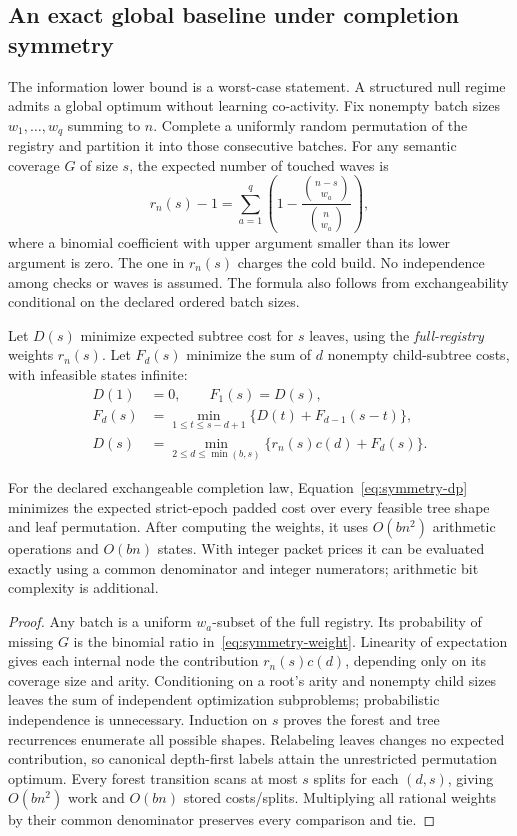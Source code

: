 \subsection{An exact global baseline under completion symmetry}\label{sec:symmetry}
The information lower bound is a worst-case statement. A structured null
regime admits a global optimum without learning co-activity. Fix nonempty
batch sizes $w_1,\ldots,w_q$ summing to $n$. Complete a uniformly random
permutation of the registry and partition it into those consecutive batches.
For any semantic coverage $G$ of size $s$, the expected number of touched
waves is
\begin{equation}\label{eq:symmetry-weight}
 r_n(s)-1=\sum_{a=1}^q\left(1-
       \frac{\binom{n-s}{w_a}}{\binom n{w_a}}\right),
\end{equation}
where a binomial coefficient with upper argument smaller than its lower
argument is zero. The one in $r_n(s)$ charges the cold build.
No independence among checks or waves is assumed. The formula also follows
from exchangeability conditional on the declared ordered batch sizes.

Let $D(s)$ minimize expected subtree cost for $s$ leaves, using the
\emph{full-registry} weights $r_n(s)$. Let $F_d(s)$ minimize the sum of
$d$ nonempty child-subtree costs, with infeasible states infinite:
\begin{align}
 D(1)&=0,\qquad F_1(s)=D(s),\nonumber\\
 F_d(s)&=\min_{1\le t\le s-d+1}\{D(t)+F_{d-1}(s-t)\},\nonumber\\
 D(s)&=\min_{2\le d\le\min(b,s)}
        \{r_n(s)c(d)+F_d(s)\}.\label{eq:symmetry-dp}
\end{align}

\begin{theorem}\label{thm:symmetry}
For the declared exchangeable completion law, Equation~\eqref{eq:symmetry-dp}
minimizes the expected strict-epoch padded cost over every feasible tree
shape and leaf permutation. After computing the weights, it uses
$O(bn^2)$ arithmetic operations and $O(bn)$ states. With integer packet
prices it can be evaluated exactly using a common denominator and integer
numerators; arithmetic bit complexity is additional.
\end{theorem}
\begin{proof}
Any batch is a uniform $w_a$-subset of the full registry. Its probability
of missing $G$ is the binomial ratio in~\eqref{eq:symmetry-weight}.
Linearity of expectation gives each internal node the contribution
$r_n(s)c(d)$, depending only on its coverage size and arity. Conditioning
on a root's arity and nonempty child sizes leaves the sum of independent
optimization subproblems; probabilistic independence is unnecessary.
Induction on $s$ proves the forest and tree recurrences enumerate all
possible shapes. Relabeling leaves changes no expected contribution, so
canonical depth-first labels attain the unrestricted permutation optimum.
Every forest transition scans at most $s$ splits for each $(d,s)$,
giving $O(bn^2)$ work and $O(bn)$ stored costs/splits. Multiplying all rational
weights by their common denominator preserves every comparison and tie.
\end{proof}

